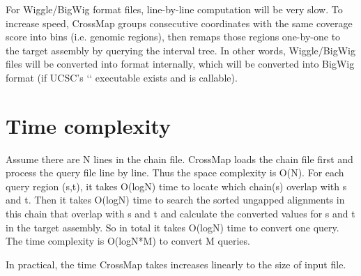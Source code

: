 \documentclass[letterpaper,10pt,english]{sphinxmanual}
\begin{document}
For Wiggle/BigWig format files, line-by-line computation will be very slow. To increase speed,
CrossMap groups consecutive coordinates with the same coverage score into bins (i.e. genomic regions),
then remaps those regions one-by-one to the target assembly by querying the interval tree.  In other words, Wiggle/BigWig files will
be converted into  format
internally, which will be converted into BigWig format (if UCSC’s ``
executable exists and is callable).


\section{Time complexity}
\label{\detokenize{index:time-complexity}}
Assume there are N lines in the chain file. CrossMap loads the chain file first and process
the query file line by line. Thus the space complexity is O(N). For each query region (s,t),
it takes O(logN) time to locate which chain(s) overlap with s and t. Then it takes O(logN)
time to search the sorted ungapped alignments in this chain that overlap with s and t and
calculate the converted values for s and t in the target assembly. So in total it takes O(logN)
time to convert one query. The time complexity is O(logN*M) to convert M queries.

In practical, the time CrossMap takes increases linearly to the size of input file.
\end{document}
